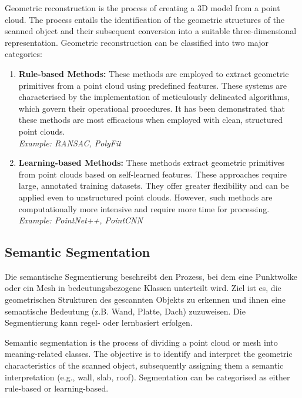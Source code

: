 \begin{English}
    Geometric reconstruction is the process of creating a 3D model from a point cloud. The process entails the identification of the geometric structures of the scanned object and their subsequent conversion into a suitable three-dimensional representation. Geometric reconstruction can be classified into two major categories:

    \begin{enumerate}
        \item \textbf{Rule-based Methods:} These methods are employed to extract geometric primitives from a point cloud using predefined features. These systems are characterised by the implementation of meticulously delineated algorithms, which govern their operational procedures. It has been demonstrated that these methods are most efficacious when employed with clean, structured point clouds. \cite{fangScantoBIMtoSimAutomatedReconstruction2025}\\
        \textit{Example: RANSAC, PolyFit}

        \item \textbf{Learning-based Methods:} These methods extract geometric primitives from point clouds based on self-learned features. These approaches require large, annotated training datasets. They offer greater flexibility and can be applied even to unstructured point clouds. However, such methods are computationally more intensive and require more time for processing. \cite{fangScantoBIMtoSimAutomatedReconstruction2025}\\
        \textit{Example: PointNet++, PointCNN}
    \end{enumerate}
\end{English}

\subsection{Semantic Segmentation}
\begin{German}
    Die semantische Segmentierung beschreibt den Prozess, bei dem eine Punktwolke oder ein Mesh in bedeutungsbezogene Klassen unterteilt wird. Ziel ist es, die geometrischen Strukturen des gescannten Objekts zu erkennen und ihnen eine semantische Bedeutung (z.B. Wand, Platte, Dach) zuzuweisen. Die Segmentierung kann regel- oder lernbasiert erfolgen. \cite{patilAutomaticScantoBIMTheImpact2025}
\end{German}

\begin{English}
    Semantic segmentation is the process of dividing a point cloud or mesh into meaning-related classes. The objective is to identify and interpret the geometric characteristics of the scanned object, subsequently assigning them a semantic interpretation (e.g., wall, slab, roof). Segmentation can be categorised as either rule-based or learning-based. \cite{patilAutomaticScantoBIMTheImpact2025}
\end{English}

